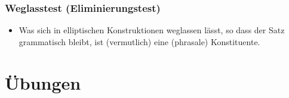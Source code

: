 \begin{frame}
\frametitle{Weglasstest (Eliminierungstest)}

\begin{itemize}
	\item Was sich in elliptischen Konstruktionen weglassen lässt, so dass der Satz grammatisch bleibt, ist (vermutlich) eine (phrasale) Konstituente.

	\eal 
	\zl

\end{itemize}

\end{frame}


\section{Übungen}

